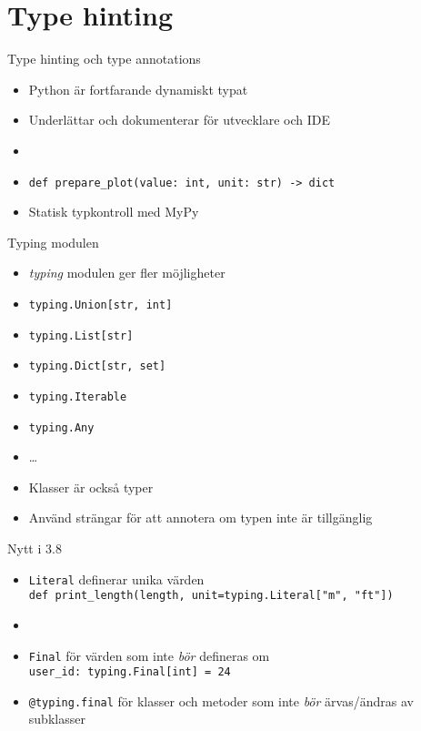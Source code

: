 \section{Type hinting}

\begin{frame}{Type hinting och type annotations}
  \begin{itemize}
    \item Python är fortfarande dynamiskt typat
    \item Underlättar och dokumenterar för utvecklare och IDE
    \item[]
    \item \texttt{def prepare_plot(value: int, unit: str) -> dict}
    \item Statisk typkontroll med MyPy
  \end{itemize}

\end{frame}

\begin{frame}{Typing modulen}
  \begin{itemize}
    \item \emph{typing} modulen ger fler möjligheter
    \item \texttt{typing.Union[str, int]}
    \item \texttt{typing.List[str]}
    \item \texttt{typing.Dict[str, set]}
    \item \texttt{typing.Iterable}
    \item \texttt{typing.Any}
    \item …
    \item Klasser är också typer
    \item Använd strängar för att annotera om typen inte är tillgänglig
  \end{itemize}
\end{frame}

\begin{frame}[fragile]{Nytt i 3.8}
  \begin{itemize}
    \item \texttt{Literal} definerar unika värden\\
      {\small\texttt{def print_length(length, unit=typing.Literal["m", "ft"])}}
    \item[]
    \item \texttt{Final} för värden som inte \emph{bör} defineras om\\
     \texttt{user_id: typing.Final[int] = 24}
    \item \texttt{@typing.final} för klasser och metoder som inte \emph{bör} ärvas/ändras av subklasser
  \end{itemize}
\end{frame}

